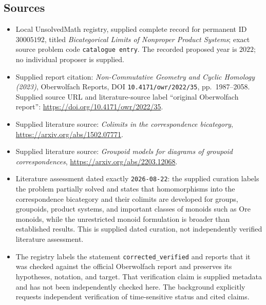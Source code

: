 \documentclass[11pt]{article}
\begin{document}
\subsection{Sources}
\begin{itemize}
\item Local UnsolvedMath registry, supplied complete record for permanent ID \(30005192\), titled \emph{Bicategorical Limits of Nonproper Product Systems}; exact source problem code \texttt{catalogue entry}. The recorded proposed year is \(2022\); no individual proposer is supplied.
\item Supplied report citation: \emph{Non-Commutative Geometry and Cyclic Homology (2023)}, Oberwolfach Reports, DOI \texttt{10.4171/owr/2022/35}, pp.~1987--2058. Supplied source URL and literature-source label ``original Oberwolfach report'': \url{https://doi.org/10.4171/owr/2022/35}.
\item Supplied literature source: \emph{Colimits in the correspondence bicategory}, \url{https://arxiv.org/abs/1502.07771}.
\item Supplied literature source: \emph{Groupoid models for diagrams of groupoid correspondences}, \url{https://arxiv.org/abs/2203.12068}.
\item Literature assessment dated exactly \texttt{2026-08-22}: the supplied curation labels the problem partially solved and states that homomorphisms into the correspondence bicategory and their colimits are developed for groups, groupoids, product systems, and important classes of monoids such as Ore monoids, while the unrestricted monoid formulation is broader than established results. This is supplied dated curation, not independently verified literature assessment.
\item The registry labels the statement \texttt{corrected\_verified} and reports that it was checked against the official Oberwolfach report and preserves its hypotheses, notation, and target. That verification claim is supplied metadata and has not been independently checked here. The background explicitly requests independent verification of time-sensitive status and cited claims.
\end{itemize}
\end{document}
